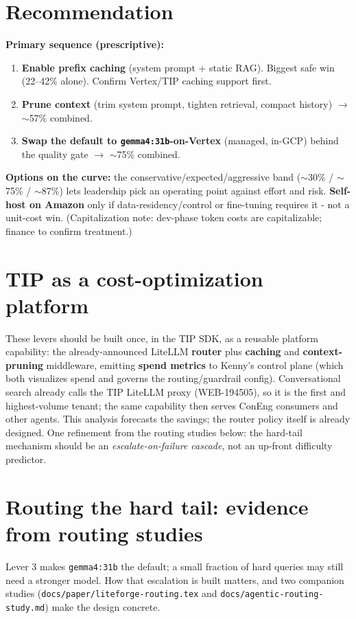 \documentclass[11pt]{article}
\newcommand{\code}[1]{\texttt{\small #1}}
\begin{document}
\section{Recommendation}
\textbf{Primary sequence (prescriptive):}
\begin{enumerate}[leftmargin=1.5em,itemsep=1pt]
\item \textbf{Enable prefix caching} (system prompt + static RAG). Biggest safe win
(22--42\% alone). Confirm Vertex/TIP caching support first.
\item \textbf{Prune context} (trim system prompt, tighten retrieval, compact history)
$\rightarrow$ $\sim$57\% combined.
\item \textbf{Swap the default to \code{gemma4:31b}-on-Vertex} (managed, in-GCP) behind the
quality gate $\rightarrow$ $\sim$75\% combined.
\end{enumerate}
\textbf{Options on the curve:} the conservative/expected/aggressive band ($\sim$30\% / $\sim$75\%
/ $\sim$87\%) lets leadership pick an operating point against effort and risk. \textbf{Self-host
on Amazon} only if data-residency/control or fine-tuning requires it - not a unit-cost win.
(Capitalization note: dev-phase token costs are capitalizable; finance to confirm treatment.)

\section{TIP as a cost-optimization platform}
\label{sec:platform}
These levers should be built once, in the TIP SDK, as a reusable platform capability: the
already-announced LiteLLM \textbf{router} plus \textbf{caching} and \textbf{context-pruning}
middleware, emitting \textbf{spend metrics} to Kenny's control plane (which both visualizes
spend and governs the routing/guardrail config). Conversational search already calls the TIP
LiteLLM proxy (WEB-194505), so it is the first and highest-volume tenant; the same capability
then serves ConEng consumers and other agents. This analysis forecasts the savings; the router
policy itself is already designed. One refinement from the routing studies below: the hard-tail
mechanism should be an \emph{escalate-on-failure cascade}, not an up-front difficulty predictor.

\section{Routing the hard tail: evidence from routing studies}
\label{sec:hardtail}
Lever 3 makes \code{gemma4:31b} the default; a small fraction of hard queries may still need a
stronger model. How that escalation is built matters, and two companion studies
(\code{docs/paper/liteforge-routing.tex} and \code{docs/agentic-routing-study.md}) make the design
concrete.
\end{document}
